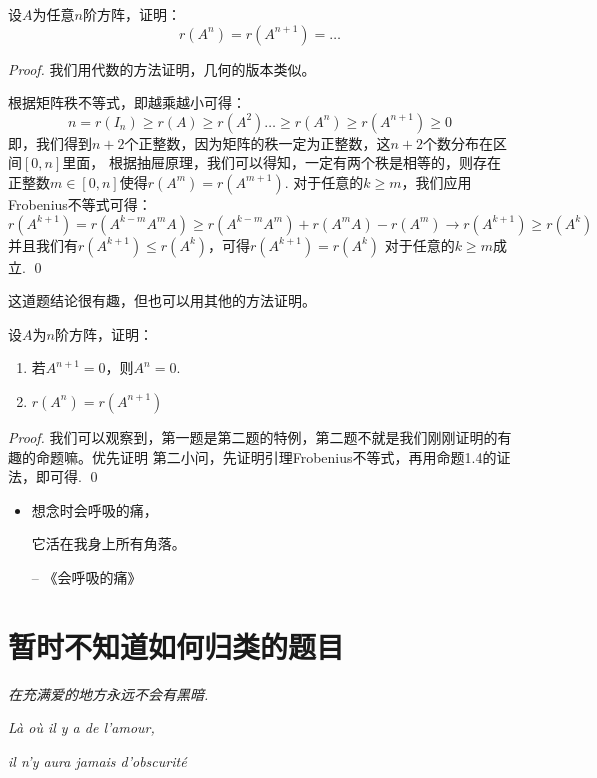 \begin{proposition}
	设$A$为任意$n$阶方阵，证明：
	$$
		r(A^{n}) = r(A^{n+1}) = \dots
	$$
\end{proposition}

\begin{proof}
	我们用代数的方法证明，几何的版本类似。
	
	根据矩阵秩不等式，即越乘越小可得：
	$$
		n=r(I_n) \geq r(A) \geq r(A^2) \dots \geq r(A^{n}) \geq r(A^{n+1}) \geq 0
	$$
	即，我们得到$n+2$个正整数，因为矩阵的秩一定为正整数，这$n+2$个数分布在区间$[0,n]$里面，
	根据抽屉原理，我们可以得知，一定有两个秩是相等的，则存在正整数$m \in [0,n]$使得$r(A^m)=r(A^{m+1})$.
	对于任意的$k \geq m$，我们应用Frobenius不等式可得：
	$$
		r(A^{k+1}) = r(A^{k-m}A^m A) \geq r(A^{k-m}A^m) + r(A^m A) - r(A^m)
		\to r(A^{k+1}) \geq r(A^k) 
	$$
	并且我们有$r(A^{k+1}) \leq r(A^k)$，可得$r(A^{k+1}) = r(A^k)$ 对于任意的$k \geq m$成立.
	\qed
\end{proof}

这道题结论很有趣，但也可以用其他的方法证明。

\begin{ex}[SJTU 2022]
	设$A$为$n$阶方阵，证明：
	\begin{enumerate}
		\item 若$A^{n+1}=0$，则$A^n=0$.
		\item $r(A^n) = r(A^{n+1})$
	\end{enumerate}
\end{ex}

\begin{proof}
	我们可以观察到，第一题是第二题的特例，第二题不就是我们刚刚证明的有趣的命题嘛。优先证明
	第二小问，先证明引理Frobenius不等式，再用命题1.4的证法，即可得.
	\qed
\end{proof}

\begin{itemize}
	\item 想念时会呼吸的痛，

	它活在我身上所有角落。                        
	
	-- 《会呼吸的痛》
\end{itemize}

\chapter{暂时不知道如何归类的题目}

\begin{introduction}
	\item \emph{在充满爱的地方永远不会有黑暗.}
	\item \emph{Là où il y a de l'amour,}
	\item \emph{il n'y aura jamais d'obscurité}
\end{introduction}

